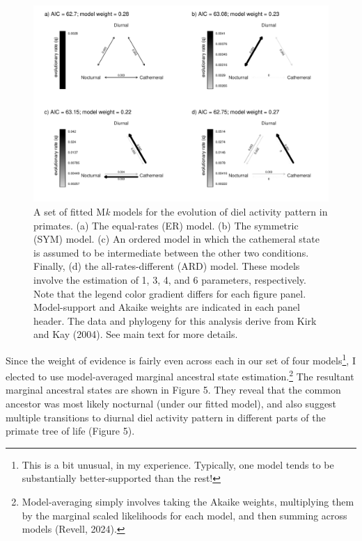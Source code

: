 \documentclass{article}
\begin{document}
\begin{figure}
\includegraphics[width=1\linewidth]{Revell.AncestralReconstruction_files/figure-latex/fig4-1} \caption{A set of fitted M\emph{k} models for the evolution of diel activity pattern in primates. (a) The equal-rates (ER) model. (b) The symmetric (SYM) model. (c) An ordered model in which the cathemeral state is assumed to be intermediate between the other two conditions. Finally, (d) the all-rates-different (ARD) model. These models involve the estimation of 1, 3, 4, and 6 parameters, respectively. Note that the legend color gradient differs for each figure panel. Model-support and Akaike weights are indicated in each panel header. The data and phylogeny for this analysis derive from Kirk and Kay (2004). See main text for more details.}\label{fig:fig4}
\end{figure}

Since the weight of evidence is fairly even across each in our set of four models\footnote{This is a bit unusual, in my experience. Typically, one model tends to be substantially better-supported than the rest!}, I elected to use model-averaged marginal ancestral state estimation.\footnote{Model-averaging simply involves taking the Akaike weights, multiplying them by the marginal scaled likelihoods for each model, and then summing across models (Revell, 2024).} The resultant marginal ancestral states are shown in Figure 5. They reveal that the common ancestor was most likely nocturnal (under our fitted model), and also suggest multiple transitions to diurnal diel activity pattern in different parts of the primate tree of life (Figure 5).
\end{document}
